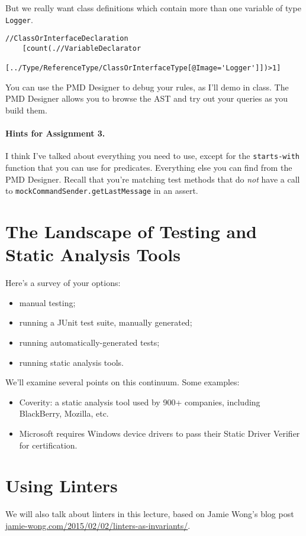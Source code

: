 \documentclass[11pt]{article}
\begin{document}
But we really want class definitions which contain more than one 
variable of type {\tt Logger}. 
\noindent
{\small \begin{verbatim}
//ClassOrInterfaceDeclaration
    [count(.//VariableDeclarator
      [../Type/ReferenceType/ClassOrInterfaceType[@Image='Logger']])>1]
\end{verbatim}

You can use the PMD Designer to debug your rules, as I'll demo in class. The PMD Designer allows you to browse the AST and try out your queries as you build them.

\paragraph{Hints for Assignment 3.} I think I've talked about everything you need to use, except for the {\tt starts-with} function that you can use for predicates. Everything else you can find from the PMD Designer. Recall that you're matching test methods that do \emph{not} have a call to {\tt mockCommandSender.getLastMessage} in an assert.

\section*{The Landscape of Testing and Static Analysis Tools}
Here's a survey of your options:
\begin{itemize}[noitemsep]
    \item manual testing;
    \item running a JUnit test suite, manually generated;
    \item running automatically-generated tests;
    \item running static analysis tools.
\end{itemize}
We'll examine several points on this continuum.
Some examples:
\begin{itemize}[noitemsep]
    \item Coverity: a static analysis tool used by 900+ companies,
      including BlackBerry, Mozilla, etc.
    \item Microsoft requires Windows device drivers
      to pass their Static Driver Verifier for certification.
\end{itemize}

\section*{Using Linters}
We will also talk about linters in this lecture, based on Jamie Wong's blog post \url{jamie-wong.com/2015/02/02/linters-as-invariants/}.

}
\end{document}
